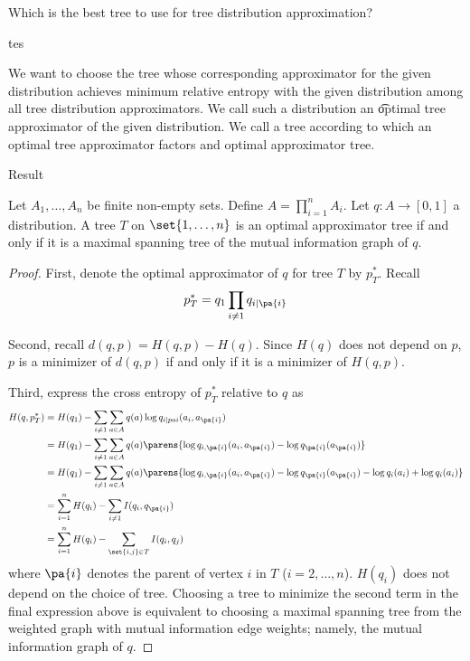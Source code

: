 
Which is the best tree to use for tree distribution approximation?

tes

We want to choose the tree whose corresponding approximator for the given distribution achieves minimum relative entropy with the given distribution among all tree distribution approximators.
We call such a distribution an \t{optimal tree approximator} of the given distribution.
We call a tree according to which an optimal tree approximator factors and optimal approximator tree.

{Result}

\begin{prop}

Let $A_1, \dots, A_n$ be finite non-empty sets.
Define $A = \prod_{i = 1}^{n} A_i$.
Let $q: A \to [0, 1]$ a distribution.
A tree $T$ on $\set{1, \dots, n}$ is an optimal approximator tree if and only if it is a maximal spanning tree of the mutual information graph of $q$.

\begin{proof}
First, denote the optimal approximator of $q$ for tree $T$ by $p^*_T$. Recall
$$
  p^*_T = q_1 \prod_{i \neq 1} q_{i \mid \pa{i}}
$$

Second, recall $d(q, p) = H(q, p) - H(q)$.
Since $H(q)$ does not depend on $p$, $p$ is a minimizer of $d(q, p)$ if and only if it is a minimizer of $H(q, p)$.

Third, express the cross entropy of $p^*_T$ relative to $q$ as
$$
\begin{aligned}
  H(q, p^*_T) &= H(q_1) - \sum_{i \neq 1} \sum_{a \in A} q(a)\log q_{i \mid pa{i}}(a_i, a_{\pa{i}}) \\
              &= H(q_1) - \sum_{i \neq 1} \sum_{a \in A} q(a)\parens{\log q_{i,\pa{i}}(a_i, a_{\pa{i}}) - \log q_{\pa{i}}(a_{\pa{i}})} \\
              &= H(q_1) - \sum_{i \neq 1} \sum_{a \in A} q(a)\parens{\log q_{i,\pa{i}}(a_i, a_{\pa{i}}) - \log q_{\pa{i}}(a_{\pa{i}}) - \log q_i(a_i)  + \log q_{i}(a_i)} \\
              &= \sum_{i = 1}^{n} H(q_i) - \sum_{i \neq 1} I(q_i, q_{\pa{i}}) \\
              &= \sum_{i = 1}^{n} H(q_i) - \sum_{\set{i,j} \in T} I(q_i, q_{j}) \\
\end{aligned}
$$
where $\pa{i}$ denotes the parent of vertex $i$ in $T$ ($i = 2, \dots, n$).
$H(q_i)$ does not depend on the choice of tree.
Choosing a tree to minimize the second term in the final expression above is equivalent to choosing a maximal spanning tree from the weighted graph with mutual information edge weights; namely, the mutual information graph of $q$.

\end{proof}

\end{prop}
\strats
